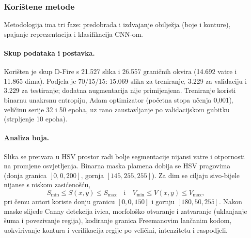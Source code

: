\subsubsection{Korištene metode}
Metodologija ima tri faze: predobrada i izdvajanje obilježja (boje i konture), spajanje reprezentacija i klasifikacija CNN-om.

\paragraph{Skup podataka i postavka.} Korišten je skup D-Fire s 21.527 slika i 26.557 graničnih okvira (14.692 vatre i 11.865 dima). Podjela je 70/15/15: 15.069 slika za treniranje, 3.229 za validaciju i 3.229 za testiranje; dodatna augmentacija nije primijenjena. Treniranje koristi binarnu unakrsnu entropiju, Adam optimizator (početna stopa učenja 0,001), veličinu serije 32 i 50 epoha, uz rano zaustavljanje po validacijskom gubitku (strpljenje 10 epoha).

\paragraph{Analiza boja.} Slika se pretvara u HSV prostor radi bolje segmentacije nijansi vatre i otpornosti na promjene osvjetljenja. Binarna maska plamena dobija se HSV pragovima (donja granica $[0, 0, 200]$, gornja $[145, 255, 255]$). Za dim se ciljaju sivo-bijele nijanse s niskom zasićenošću,
\begin{equation}
S_{\min} \le S(x,y) \le S_{\max} \quad\text{i}\quad V_{\min} \le V(x,y) \le V_{\max},
\end{equation}
pri čemu autori koriste donju granicu $[0, 0, 150]$ i gornju $[180, 50, 255]$. Nakon maske slijede Canny detekcija ivica, morfološko otvaranje i zatvaranje (uklanjanje šuma i povezivanje regija), kodiranje granica Freemanovim lančanim kodom, uokvirivanje kontura i verifikacija regije po veličini, intenzitetu i raspodjeli.

